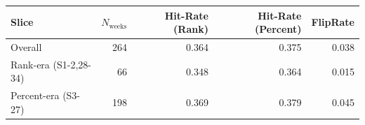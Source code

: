 \begin{tabular}{lrrrr}
\hline
Slice & $N_{\mathrm{weeks}}$ & Hit-Rate (Rank) & Hit-Rate (Percent) & FlipRate \\
\hline
Overall & 264 & 0.364 & 0.375 & 0.038 \\
Rank-era (S1-2,28-34) & 66 & 0.348 & 0.364 & 0.015 \\
Percent-era (S3-27) & 198 & 0.369 & 0.379 & 0.045 \\
\hline
\end{tabular}